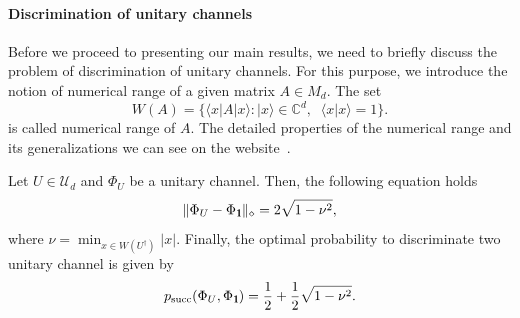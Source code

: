 \documentclass[preprint,12pt, a4paper]{elsarticle}
\newcommand{\ket}[1]{\ensuremath{|#1\rangle}}
\newcommand{\bra}[1]{\ensuremath{\langle#1|}}
\newcommand{\braket}[2]{\ensuremath{\langle{#1}|{#2}\rangle}}
\newcommand{\1}{{\rm 1\hspace{-0.9mm}l}}
\newcommand{\Id}{{\rm 1\hspace{-0.9mm}l}}
\newcommand{\UU}{\mathcal{U}}
\begin{document}
\paragraph{Discrimination of unitary channels}

Before we proceed to presenting our main results, we need to briefly discuss the
problem of discrimination of unitary channels.  For this purpose, we introduce the notion of numerical range of
a given matrix $A \in M_d$. The set \begin{equation}
W(A) =\{\bra{x}A\ket{x}: \ket{x} \in 
\mathbb{C}^d, \;
\;\braket{x}{x}=1\}.
\end{equation}   
is called numerical range of $A$.
The detailed properties of the numerical range and its generalizations we can see on the website~\cite{nr}. 

	Let $U \in \UU_d$ and $\Phi_U$ be a unitary 
	channel. 
	Then, the following equation holds
	\begin{equation}
	\| \Phi_U  - \Phi_{\1} \|_\diamond = 2 \sqrt{1-\nu^2},
	\end{equation}
	where $\nu = \min_{x \in W(U^\dagger)} |x|  $. Finally, the optimal probability to discriminate two unitary channel is given by 
	\begin{equation}
	p_{\text{succ}}(\Phi_U, \Phi_\Id) = \frac{1}{2} + \frac{1}{2} \sqrt{1-\nu^2}.
	\end{equation}




\end{document}
